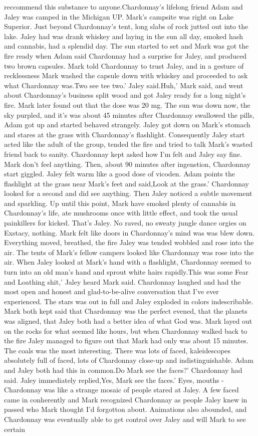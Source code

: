 \documentclass[12pt]{book}
\begin{document}
reccommend this substance to anyone.Chardonnay's lifelong friend Adam and Jaley was camped in the Michigan UP. Mark's campsite was right on Lake Superior. Just beyond Chardonnay's tent, long slabs of rock jutted out into the lake. Jaley had was drank whiskey and laying in the sun all day, smoked hash and cannabis, had a splendid day. The sun started to set and Mark was got the fire ready when Adam said Chardonnay had a surprise for Jaley, and produced two brown capsules. Mark told Chardonnay to trust Jaley, and in a gesture of recklessness Mark washed the capsule down with whiskey and proceeded to ask what Chardonnay was.Two see tee two.' Jaley said.Huh,' Mark said, and went about Chardonnay's business split wood and got Jaley ready for a long night's fire. Mark later found out that the dose was 20 mg. The sun was down now, the sky purpled, and it's was about 45 minutes after Chardonnay swallowed the pills, Adam got up and started behaved strangely. Jaley got down on Mark's stomach and stares at the grass with Chardonnay's flashlight. Consequently Jaley start acted like the adult of the group, tended the fire and tried to talk Mark's wasted friend back to sanity. Chardonnay kept asked how I'm felt and Jaley say fine. Mark don't feel anything. Then, about 90 minutes after ingenstion, Chardonnay start giggled. Jaley felt warm like a good dose of vicoden. Adam points the flashlight at the grass near Mark's feet and said,Look at the grass.' Chardonnay looked for a second and did see anything. Then Jaley noticed a subtle movement and sparkling. Up until this point, Mark have smoked plenty of cannabis in Chardonnay's life, ate mushrooms once with little effect, and took the usual painkillers for kicked. That's Jaley. No raved, no sweaty jungle dance orgies on Exstacy, nothing. Mark felt like doors in Chardonnay's mind was was blew down. Everything moved, breathed, the fire Jaley was tended wobbled and rose into the air. The tents of Mark's fellow campers looked like Chardonnay was rose into the air. When Jaley looked at Mark's hand with a flashlight, Chardonnay seemed to turn into an old man's hand and sprout white hairs rapidly.This was some Fear and Loathing shit,' Jaley heard Mark said. Chardonnay laughed and had the most open and honest and glad-to-be-alive conversation that I've ever experienced. The stars was out in full and Jaley exploded in colors indescribable. Mark both kept said that Chardonnay was the perfect evened, that the planets was aligned, that Jaley both had a better idea of what God was. Mark layed out on the rocks for what seemed like hours, but when Chardonnay walked back to the fire Jaley managed to figure out that Mark had only was about 15 minutes. The coals was the most interesting. There was lots of faced, kaleidescopes absolutely full of faced, lots of Chardonnay close-up and indistinguishable. Adam and Jaley both had this in common.Do Mark see the faces?' Chardonnay had said. Jaley immediately replied,Yes, Mark see the faces.' Eyes, mouths - Chardonnay was like a strange mosaic of people stared at Jaley. A few faced came in conherently and Mark recognized Chardonnay as people Jaley knew in passed who Mark thought I'd forgotton about. Animations also abounded, and Chardonnay was eventually able to get control over Jaley and will Mark to see certain 
\end{document}
